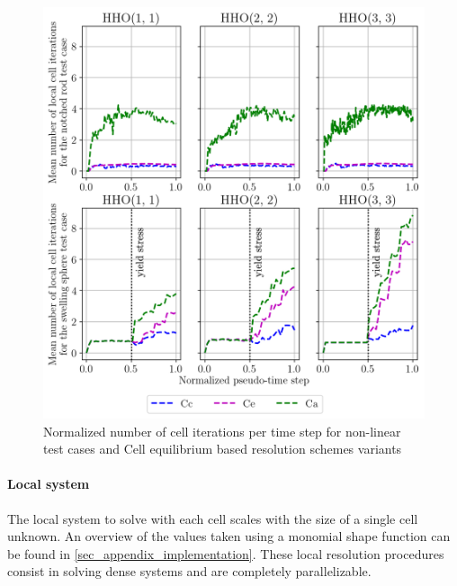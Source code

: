 \begin{figure}[H]
    \centering
    \includegraphics[width=12.cm]{../chapter_01_hho_mechanics/figures/plot_cell_iterations__4_cell_iters.png}
    \caption{Normalized number of cell iterations per time step for non-linear test cases and Cell equilibrium based resolution schemes variants}
    \label{fig_acceleration_res_1}
\end{figure}

\paragraph{Local system}

The local system to solve with each cell scales with the size of a single cell unknown. An overview of the values taken using a monomial shape function can be found in \ref{sec_appendix_implementation}. These local resolution procedures consist in solving dense systems and are completely
parallelizable.




